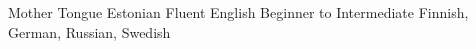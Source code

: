 

\begin{cvskills}

  \cvskill
    {Mother Tongue} %
    {Estonian} %
  \cvskill
    {Fluent} %
    {English} %
  \cvskill
    {Beginner to Intermediate} %
    {Finnish, German, Russian, Swedish} %

\end{cvskills}
